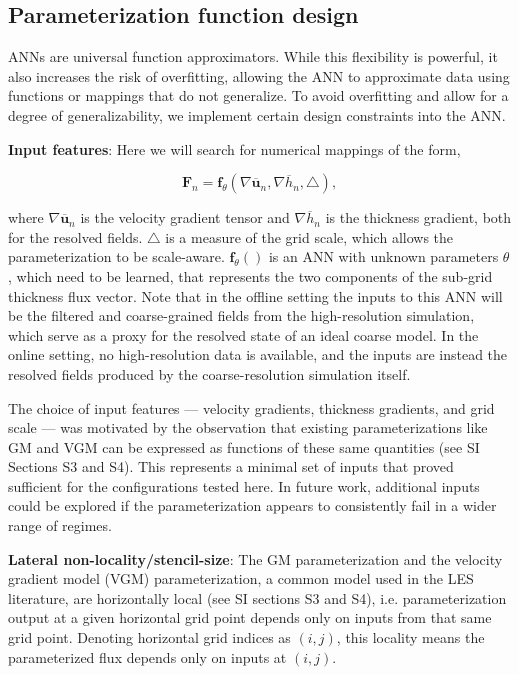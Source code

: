 \documentclass[draft]{agujournal2019}
\begin{document}
\subsection{Parameterization function design}
ANNs are universal function approximators. While this flexibility is powerful, it also increases the risk of overfitting, allowing the ANN to approximate data using functions or mappings that do not generalize. To avoid overfitting and allow for a degree of generalizability, we implement certain design constraints into the ANN. 

\textbf{Input features}:
Here we will search for numerical mappings of the form, 
\begin{linenomath*}
\begin{equation}
    \mathbf{F}_n = \mathbf{f}_{\theta}(\nabla \overline{\mathbf{u}}_n, \nabla \overline{h}_n, \triangle), 
    \label{eqn:gen_ML_func}
\end{equation}
\end{linenomath*}
where $\nabla \overline{\mathbf{u}}_n$ is the velocity gradient tensor and $\nabla \overline{h}_n$ is the thickness gradient, both for the resolved fields. 
$\triangle$ is a measure of the grid scale, which allows the parameterization to be scale-aware. $\mathbf{f}_{\theta}()$ is an ANN with unknown parameters $\theta$, which need to be learned, that represents the two components of the sub-grid thickness flux vector. 
Note that in the offline setting the inputs to this ANN will be the filtered and coarse-grained fields from the high-resolution simulation, which serve as a proxy for the resolved state of an ideal coarse model. In the online setting, no high-resolution data is available, and the inputs are instead the resolved fields produced by the coarse-resolution simulation itself. 

The choice of input features --- velocity gradients, thickness gradients, and grid scale --- was motivated by the observation that existing parameterizations like GM and VGM can be expressed as functions of these same quantities (see SI Sections S3 and S4). This represents a minimal set of inputs that proved sufficient for the configurations tested here. In future work, additional inputs could be explored if the parameterization appears to consistently fail in a wider range of regimes.


\textbf{Lateral non-locality/stencil-size}:
The GM parameterization and the velocity gradient model (VGM) parameterization, a common model used in the LES literature, are horizontally local (see SI sections S3 and S4), i.e. parameterization output at a given horizontal grid point depends only on inputs from that same grid point.  Denoting horizontal grid indices as $(i,j)$, this locality means the parameterized flux depends only on inputs at $(i,j)$.
\end{document}
